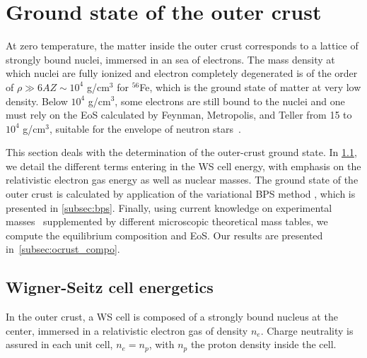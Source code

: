 \section{Ground state of the outer crust}\label{sec:ocrust_gs}

At zero temperature, the matter inside the outer crust corresponds to a 
lattice of strongly bound nuclei, immersed in an sea of electrons. The mass 
density at which nuclei are fully ionized and electron completely degenerated 
is of the order of $\rho \gg 6AZ \sim 10^4$ g/cm$^3$ for $^{56}$Fe, which is
the ground state of matter at very low density. Below $10^4$ g/cm$^3$, some 
electrons are still bound to the nuclei and one must rely on the EoS 
calculated by Feynman, Metropolis, and Teller from 15 to $10^4$ g/cm$^3$, 
suitable for the envelope of neutron stars~\cite{Feynman1949}.

This section deals with the determination of the outer-crust ground state. 
In \ref{subsec:ws}, we detail the different terms entering in the WS cell 
energy, with emphasis on the relativistic electron gas energy as well as 
nuclear masses. The ground state of the outer crust is calculated by
application of the variational BPS method \cite{BPS}, which is 
presented in \ref{subsec:bps}. Finally, using current knowledge on experimental
masses~\cite{Huang2017} supplemented by different microscopic theoretical mass
tables, we compute the equilibrium composition and EoS. Our results are
presented in~\ref{subsec:ocrust_compo}.

\subsection{Wigner-Seitz cell energetics}\label{subsec:ws}

In the outer crust, a WS cell is composed of a strongly bound nucleus at the 
center, immersed in a relativistic electron gas of 
density $n_e$. Charge neutrality is assured in each unit cell, 
$n_e = n_p$, with $n_p$ the proton density inside the cell.

